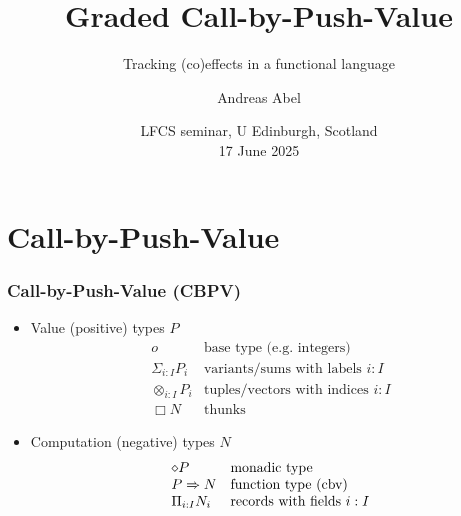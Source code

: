 \documentclass[t,fleqn,usenames,dvipsnames]{beamer}
\title[Graded CBPV]{Graded Call-by-Push-Value}
\subtitle{Tracking (co)effects in a functional language}
\author[Abel]{
  Andreas Abel%
}
\institute[] %
{
  Department of Computer Science and Engineering\\
  Chalmers and University of Gothenburg, Sweden %
}
\date[LFCS'25] %
{ LFCS seminar, U Edinburgh, Scotland \\
  17 June 2025
}
\begin{document}
\maketitle


\section{Call-by-Push-Value}




\newcommand{\sumt}   [2]{\ensuremath{\Sigma_{#1} #2}}
\newcommand{\tupt}   [2]{\ensuremath{\mathop\otimes_{#1} #2}}
\newcommand{\rect}   [2]{\ensuremath{\Pi_{#1} #2}}
\newcommand{\sumty}  [3]{\ensuremath{\Sigma_{#1:#2} #3_{#1}}}
\newcommand{\tupty}  [3]{\ensuremath{\mathop\otimes_{#1:#2} #3_{#1}}}
\newcommand{\recty}  [3]{\ensuremath{\Pi_{#1:#2} #3_{#1}}}
\newcommand{\thunkty}[2]{\ensuremath{[#1]#2}}
\newcommand{\compty} [2]{\ensuremath{\langle#1\rangle#2}}


\begin{frame}%
  \frametitle{Call-by-Push-Value (CBPV)}
  \begin{itemize}
  \item Value (positive) types $P$ %
\[
  \begin{array}{ll}
    o & \mbox{base type (e.g. integers)} \\
    \sumty i I P & \mbox{variants/sums with labels $i:I$} \\
    \tupty i I P & \mbox{tuples/vectors with indices $i:I$} \\
    \Box N       & \mbox{thunks}
  \end{array}
\]
  \item Computation (negative) types $N$ %
\[
  \begin{array}{ll}
    \diamond P & \mbox{monadic type} \\
    P \To N & \mbox{function type (cbv)} \\
    \recty i I N & \mbox{records with fields $i:I$} \\
  \end{array}
\]
  \end{itemize}
\end{frame}
\end{document}
